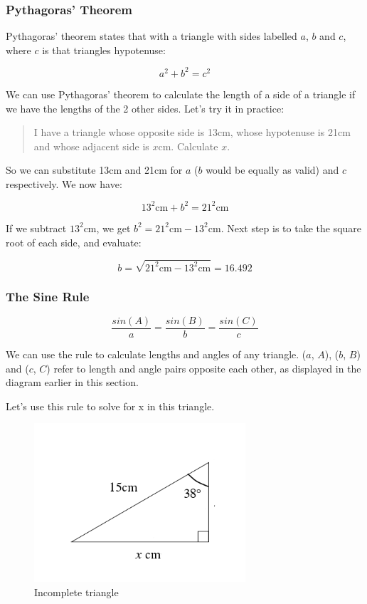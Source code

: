 \hypertarget{pythagoras-theorem}{%
\subsubsection{Pythagoras' Theorem}\label{pythagoras-theorem}}

Pythagoras' theorem states that with a triangle with sides labelled \(a\), \(b\) and \(c\), where \(c\) is that triangles hypotenuse:

\[a^2+b^2=c^2\]

We can use Pythagoras' theorem to calculate the length of a side of a triangle if we have the lengths of the 2 other sides. Let's try it in practice:

\begin{quote}
I have a triangle whose opposite side is 13cm, whose hypotenuse is 21cm and whose adjacent side is \(x\)cm. Calculate \(x\).
\end{quote}

So we can substitute 13cm and 21cm for \(a\) (\(b\) would be equally as valid) and \(c\) respectively. We now have:

\[13^2\mathrm{cm}+b^2=21^2\mathrm{cm}\]

If we subtract \(13^2\mathrm{cm}\), we get \(b^2=21^2\mathrm{cm}-13^2\mathrm{cm}\). Next step is to take the square root of each side, and evaluate:

\[b=\sqrt{21^2\mathrm{cm}-13^2\mathrm{cm}}=16.492\]

\hypertarget{the-sine-rule}{%
\subsubsection{The Sine Rule}\label{the-sine-rule}}

\[\frac{sin(A)}{a}=\frac{sin(B)}{b}=\frac{sin(C)}{c}\]

We can use the rule to calculate lengths and angles of any triangle. (\(a\), \(A\)), (\(b\), \(B\)) and (\(c\), \(C\)) refer to length and angle pairs opposite each other, as displayed in the diagram earlier in this section.

Let's use this rule to solve for x in this triangle.

\begin{figure}
\includegraphics[width=0.7\textwidth,height=\textheight]{./images/trig_triangle_2.png}
\caption{Incomplete triangle}
\end{figure}

